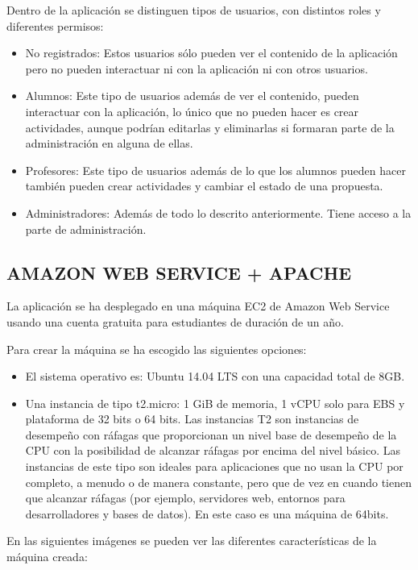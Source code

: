 Dentro de la aplicación se distinguen tipos de usuarios, con distintos roles y diferentes permisos:

\begin{itemize}
\item No registrados: Estos usuarios sólo pueden ver el contenido de la aplicación pero no pueden interactuar ni con la aplicación ni con otros usuarios.
\item Alumnos: Este tipo de usuarios además de ver el contenido, pueden interactuar con la aplicación, lo único que no pueden hacer es crear actividades, aunque podrían editarlas y eliminarlas si formaran parte de la administración en alguna de ellas.
\item Profesores: Este tipo de usuarios además de lo que los alumnos pueden hacer también pueden crear actividades y cambiar el estado de una propuesta.
\item Administradores: Además de todo lo descrito anteriormente. Tiene acceso a la parte de administración.
\end{itemize}


\subsection{AMAZON WEB SERVICE + APACHE} 
\label{subsec:aws_apache}

La aplicación se ha desplegado en una máquina EC2 de Amazon Web Service usando una cuenta gratuita para estudiantes de duración de un año.

Para crear la máquina se ha escogido las siguientes opciones:
\begin{itemize}
\item El sistema operativo es: Ubuntu 14.04 LTS con una capacidad total de 8GB.
\item Una instancia de tipo t2.micro: 1 GiB de memoria, 1 vCPU solo para EBS y plataforma de 32 bits o 64 bits. Las instancias T2 son instancias de desempeño con ráfagas que proporcionan un nivel base de desempeño de la CPU con la posibilidad de alcanzar ráfagas por encima del nivel básico. Las instancias de este tipo son ideales para aplicaciones que no usan la CPU por completo, a menudo o de manera constante, pero que de vez en cuando tienen que alcanzar ráfagas (por ejemplo, servidores web, entornos para desarrolladores y bases de datos). En este caso es una máquina de 64bits.
\end{itemize}

En las siguientes imágenes se pueden ver las diferentes características de la máquina creada:

